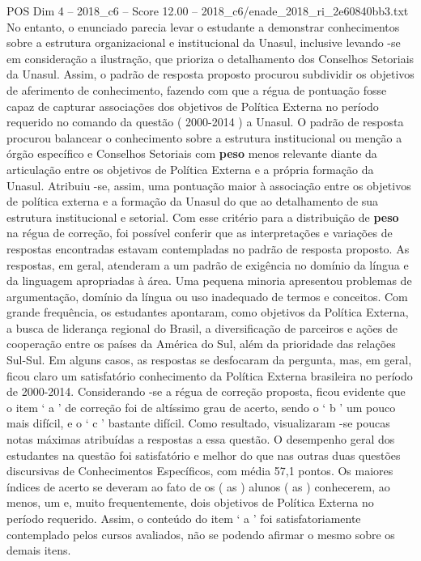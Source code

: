 \begin{textsample}{POS Dim 4 – 2018\_c6 – Score 12.00 – 2018\_c6/enade\_2018\_ri\_2e60840bb3.txt}
No entanto, o enunciado parecia levar o estudante a demonstrar conhecimentos sobre a estrutura organizacional e institucional da Unasul, inclusive levando -se em consideração a ilustração, que prioriza o detalhamento dos Conselhos Setoriais da Unasul.
Assim, o padrão de resposta proposto procurou subdividir os objetivos de aferimento de conhecimento, fazendo com que a régua de pontuação fosse capaz de capturar associações dos objetivos de Política Externa no período requerido no comando da questão ( 2000-2014 ) a Unasul.
O padrão de resposta procurou balancear o conhecimento sobre a estrutura institucional ou menção a órgão específico e Conselhos Setoriais com \textbf{peso} menos relevante diante da articulação entre os objetivos de Política Externa e a própria formação da Unasul.
Atribuiu -se, assim, uma pontuação maior à associação entre os objetivos de política externa e a formação da Unasul do que ao detalhamento de sua estrutura institucional e setorial.
Com esse critério para a distribuição de \textbf{peso} na régua de correção, foi possível conferir que as interpretações e variações de respostas encontradas estavam contempladas no padrão de resposta proposto.
As respostas, em geral, atenderam a um padrão de exigência no domínio da língua e da linguagem apropriadas à área.
Uma pequena minoria apresentou problemas de argumentação, domínio da língua ou uso inadequado de termos e conceitos.
Com grande frequência, os estudantes apontaram, como objetivos da Política Externa, a busca de liderança regional do Brasil, a diversificação de parceiros e ações de cooperação entre os países da América do Sul, além da prioridade das relações Sul-Sul.
Em alguns casos, as respostas se desfocaram da pergunta, mas, em geral, ficou claro um satisfatório conhecimento da Política Externa brasileira no período de 2000-2014.
Considerando -se a régua de correção proposta, ficou evidente que o item ‘ a ’ de correção foi de altíssimo grau de acerto, sendo o ‘ b ’ um pouco mais difícil, e o ‘ c ’ bastante difícil.
Como resultado, visualizaram -se poucas notas máximas atribuídas a respostas a essa questão.
O desempenho geral dos estudantes na questão foi satisfatório e melhor do que nas outras duas questões discursivas de Conhecimentos Específicos, com média 57,1 pontos.
Os maiores índices de acerto se deveram ao fato de os ( as ) alunos ( as ) conhecerem, ao menos, um e, muito frequentemente, dois objetivos de Política Externa no período requerido.
Assim, o conteúdo do item ‘ a ’ foi satisfatoriamente contemplado pelos cursos avaliados, não se podendo afirmar o mesmo sobre os demais itens.

\end{textsample}
